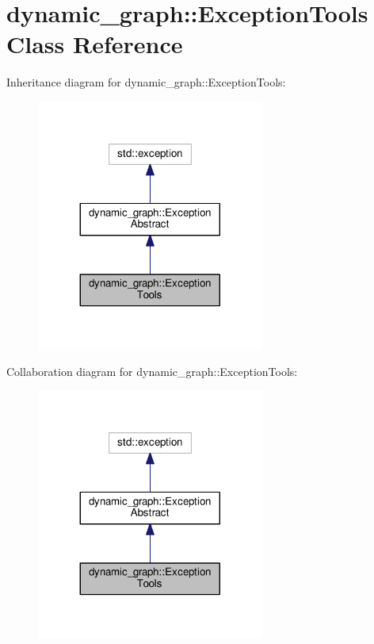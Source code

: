 \hypertarget{classdynamic__graph_1_1ExceptionTools}{}\section{dynamic\+\_\+graph\+:\+:Exception\+Tools Class Reference}
\label{classdynamic__graph_1_1ExceptionTools}


Inheritance diagram for dynamic\+\_\+graph\+:\+:Exception\+Tools\+:\nopagebreak
\begin{figure}[H]
\begin{center}
\leavevmode
\includegraphics[width=212pt]{classdynamic__graph_1_1ExceptionTools__inherit__graph}
\end{center}
\end{figure}


Collaboration diagram for dynamic\+\_\+graph\+:\+:Exception\+Tools\+:\nopagebreak
\begin{figure}[H]
\begin{center}
\leavevmode
\includegraphics[width=212pt]{classdynamic__graph_1_1ExceptionTools__coll__graph}
\end{center}
\end{figure}
